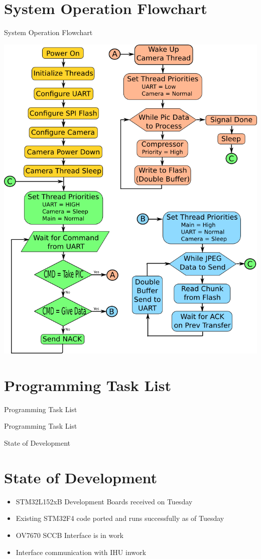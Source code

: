\documentclass{beamer}
\begin{document}
\section{System Operation Flowchart}
\begin{frame}{System Operation Flowchart}
	\begin{center}
        \includegraphics[scale=0.30]{flow_chart.png}
	\end{center}
\end{frame}

\section{Programming Task List}
\begin{frame}{Programming Task List}
	\begin{center}
		\large{Programming Task List}
	\end{center}
\end{frame}


\begin{frame}{State of Development}
\section{State of Development}
		\begin{itemize}
			\item STM32L152xB Development Boards received on Tuesday
			\item Existing STM32F4 code ported and runs successfully as of Tuesday
			\item OV7670 SCCB Interface is in work
			\item Interface communication with IHU inwork
		\end{itemize}
\end{frame}
\end{document}
